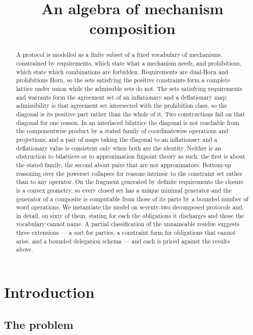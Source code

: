\documentclass[11pt,reqno]{amsart}
\title[An algebra of mechanism composition]
  {An algebra of mechanism composition}
\author{}
\date{}
\theoremstyle{plain}
\theoremstyle{definition}
\theoremstyle{remark}
\begin{document}
\begin{abstract}
A protocol is modelled as a finite subset of a fixed vocabulary of mechanisms,
constrained by requirements, which state what a mechanism needs, and
prohibitions, which state which combinations are forbidden. Requirements are
dual-Horn and prohibitions Horn, so the sets satisfying the positive constraints
form a complete lattice under union while the admissible sets do not. The sets satisfying requirements and warrants form the agreement set of an
inflationary and a deflationary map; admissibility is that agreement set
intersected with the prohibition class, so the diagonal is its positive part
rather than the whole of it. Two constructions fail on that diagonal for one
reason. In an interlaced bilattice the diagonal is not reachable from the
componentwise product by a stated family of coordinatewise operations and
projections; and a pair of maps taking the diagonal to an inflationary and a
deflationary value is consistent only when both are the identity. Neither is an
obstruction to bilattices or to approximation fixpoint theory as such: the first
is about the stated family, the second about pairs that are not approximators. Bottom-up reasoning
over the powerset collapses for reasons intrinsic to the constraint set rather
than to any operator. On the fragment generated by definite requirements the closure is a convex
geometry, so every closed set has a unique minimal generator and the generator
of a composite is computable from those of its parts by a bounded number of word
operations. We instantiate the model on seventy-two decomposed protocols and, in
detail, on sixty of them, stating for each the obligations it discharges and
those the vocabulary cannot name. A partial classification of the unnameable
residue suggests three extensions --- a sort for parties, a constraint form for
obligations that cannot arise, and a bounded delegation schema --- and each is
priced against the results above.
\end{abstract}

\maketitle

\section{Introduction}

\subsection{The problem}
\end{document}
